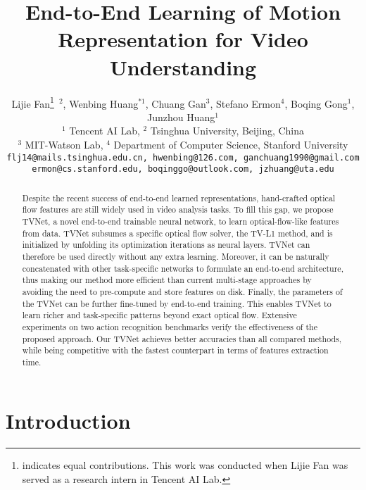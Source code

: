 \documentclass[10pt,twocolumn,letterpaper]{article}
\begin{document}
\title{End-to-End Learning of Motion Representation for Video Understanding}
\author{Lijie Fan\thanks{indicates equal contributions. This work was conducted when Lijie Fan was served as a research intern in Tencent AI Lab.}\ $^{2}$, Wenbing Huang$^{\ast1}$, Chuang Gan$^{3}$, Stefano Ermon$^{4}$, Boqing Gong$^{1}$, Junzhou Huang$^{1}$\\
$^1$ Tencent AI Lab,
$^2$ Tsinghua University, Beijing, China\\
$^3$ MIT-Watson Lab,
$^4$ Department of Computer Science, Stanford University \\
{\tt\small flj14@mails.tsinghua.edu.cn, hwenbing@126.com, ganchuang1990@gmail.com}\\
{\tt\small ermon@cs.stanford.edu, boqinggo@outlook.com, jzhuang@uta.edu}
}
\maketitle
\thispagestyle{empty}

\begin{abstract}
Despite the recent success of end-to-end learned representations, hand-crafted optical flow features are still widely used in video analysis tasks.
To fill this gap, we propose TVNet, a novel end-to-end trainable neural network, to learn optical-flow-like features from data.
TVNet subsumes a specific optical flow solver, the TV-L1 method, and is initialized by unfolding its optimization iterations as neural layers.
TVNet can therefore be used directly without any extra learning. Moreover, it can be naturally concatenated with other task-specific networks to formulate an end-to-end architecture, thus making our method more efficient than current multi-stage approaches by avoiding the need to pre-compute and store features on disk.
Finally, the parameters of the TVNet can be further fine-tuned by end-to-end training.
This enables TVNet to learn richer and task-specific patterns beyond exact optical flow.
Extensive experiments on two action recognition benchmarks verify the effectiveness of the proposed approach.  Our TVNet achieves better accuracies than all compared methods, while being competitive with the fastest counterpart in terms of features extraction time.
\end{abstract}





\section{Introduction}
\label{Sec:introduction}
\end{document}
